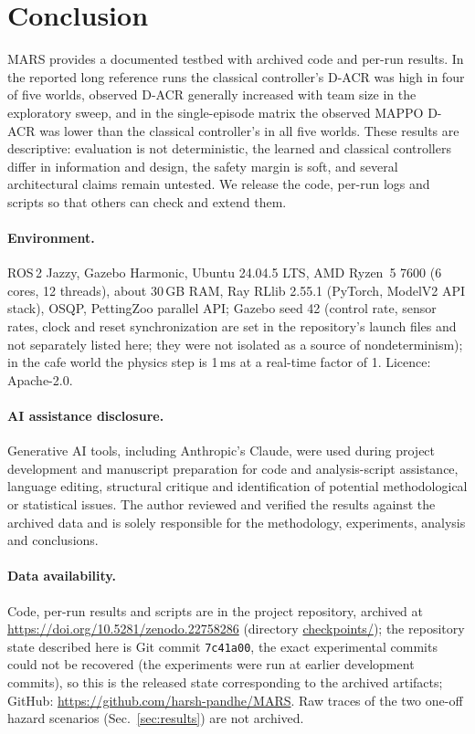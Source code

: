 \documentclass[conference]{IEEEtran}
\begin{document}
\section{Conclusion}
MARS provides a documented testbed with archived code and per-run results. In the
reported long reference runs the classical controller's D-ACR
was high in four of five worlds, observed D-ACR generally increased with
team size in the exploratory sweep, and in the single-episode matrix the
observed MAPPO D-ACR was lower than the classical controller's in all five
worlds. These results are descriptive: evaluation is not deterministic, the
learned and classical controllers differ in information and design, the safety
margin is soft, and several architectural claims remain untested. We release
the code, per-run logs and scripts so that others can check and extend them.

\paragraph*{Environment.} ROS\,2 Jazzy, Gazebo Harmonic, Ubuntu 24.04.5 LTS, AMD Ryzen~5 7600 (6 cores, 12 threads), about 30\,GB RAM, Ray RLlib 2.55.1 (PyTorch, ModelV2 API stack), OSQP, PettingZoo parallel API; Gazebo seed 42 (control rate, sensor rates, clock and reset synchronization are set in the repository's launch files and not separately listed here; they were not isolated as a source of nondeterminism); in the cafe world the physics step is 1\,ms at a real-time factor of 1. Licence: Apache-2.0.

\paragraph*{AI assistance disclosure.} Generative AI tools, including Anthropic's Claude, were used during project development and manuscript preparation for code and analysis-script assistance, language editing, structural critique and identification of potential methodological or statistical issues. The author reviewed and verified the results against the archived data and is solely responsible for the methodology, experiments, analysis and conclusions.

\paragraph*{Data availability.} Code, per-run results and scripts are in the
project repository, archived at \url{https://doi.org/10.5281/zenodo.22758286}
(directory \url{checkpoints/}); the repository state described here is Git commit \texttt{7c41a00}, the exact experimental commits could not be recovered (the experiments were run at earlier development commits), so this is the released state corresponding to the archived artifacts; GitHub: \url{https://github.com/harsh-pandhe/MARS}. Raw traces of the two one-off hazard scenarios (Sec.~\ref{sec:results}) are not archived.



\end{document}
